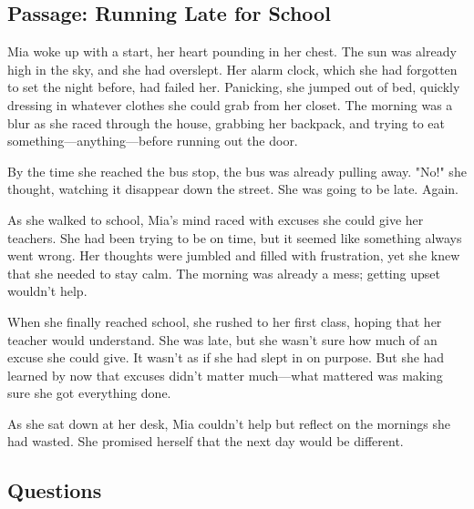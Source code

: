 \documentclass[12pt]{article}
\begin{document}
\onehalfspacing

\subsection*{Passage: Running Late for School}

\begin{tcolorbox}[colframe=black!40, colback=gray!5]
\begin{spacing}{1.15}
    Mia woke up with a start, her heart pounding in her chest. The sun was already high in the sky, and she had overslept. Her alarm clock, which she had forgotten to set the night before, had failed her. Panicking, she jumped out of bed, quickly dressing in whatever clothes she could grab from her closet. The morning was a blur as she raced through the house, grabbing her backpack, and trying to eat something—anything—before running out the door.

    By the time she reached the bus stop, the bus was already pulling away. "No!" she thought, watching it disappear down the street. She was going to be late. Again.

    As she walked to school, Mia’s mind raced with excuses she could give her teachers. She had been trying to be on time, but it seemed like something always went wrong. Her thoughts were jumbled and filled with frustration, yet she knew that she needed to stay calm. The morning was already a mess; getting upset wouldn’t help.

    When she finally reached school, she rushed to her first class, hoping that her teacher would understand. She was late, but she wasn’t sure how much of an excuse she could give. It wasn’t as if she had slept in on purpose. But she had learned by now that excuses didn’t matter much—what mattered was making sure she got everything done.

    As she sat down at her desk, Mia couldn’t help but reflect on the mornings she had wasted. She promised herself that the next day would be different.
\end{spacing}
\end{tcolorbox}

\subsection*{Questions}
\end{document}
